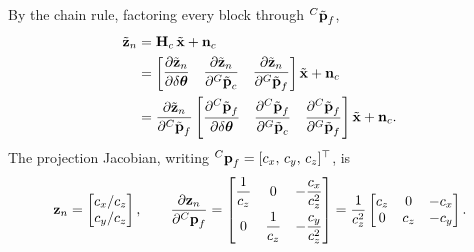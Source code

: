 By the chain rule, factoring every block through ${}^{C}\tilde{\boldsymbol{\mathbf{p}}}_f$,
\begin{align}
\tilde{\boldsymbol{\mathbf{z}}}_n &= \boldsymbol{\mathbf{H}}_c\,\tilde{\boldsymbol{\mathbf{x}}} + \boldsymbol{\mathbf{n}}_c \\
&= \begin{bmatrix} \dfrac{\partial\tilde{\boldsymbol{\mathbf{z}}}_n}{\partial\delta\boldsymbol{\mathbf{\theta}}} & \dfrac{\partial\tilde{\boldsymbol{\mathbf{z}}}_n}{\partial{}^{G}\tilde{\boldsymbol{\mathbf{p}}}_c} & \dfrac{\partial\tilde{\boldsymbol{\mathbf{z}}}_n}{\partial{}^{G}\tilde{\boldsymbol{\mathbf{p}}}_f} \end{bmatrix}\tilde{\boldsymbol{\mathbf{x}}} + \boldsymbol{\mathbf{n}}_c \\
&= \frac{\partial\tilde{\boldsymbol{\mathbf{z}}}_n}{\partial{}^{C}\tilde{\boldsymbol{\mathbf{p}}}_f}\begin{bmatrix} \dfrac{\partial{}^{C}\tilde{\boldsymbol{\mathbf{p}}}_f}{\partial\delta\boldsymbol{\mathbf{\theta}}} & \dfrac{\partial{}^{C}\tilde{\boldsymbol{\mathbf{p}}}_f}{\partial{}^{G}\tilde{\boldsymbol{\mathbf{p}}}_c} & \dfrac{\partial{}^{C}\tilde{\boldsymbol{\mathbf{p}}}_f}{\partial{}^{G}\tilde{\boldsymbol{\mathbf{p}}}_f} \end{bmatrix}\tilde{\boldsymbol{\mathbf{x}}} + \boldsymbol{\mathbf{n}}_c.
\end{align}
The projection Jacobian, writing ${}^{C}\boldsymbol{\mathbf{p}}_f = [c_x,\,c_y,\,c_z]^\top$, is
\begin{align}
\boldsymbol{\mathbf{z}}_n = \begin{bmatrix} c_x/c_z \\ c_y/c_z \end{bmatrix}, \qquad
\frac{\partial\boldsymbol{\mathbf{z}}_n}{\partial{}^{C}\boldsymbol{\mathbf{p}}_f} = \begin{bmatrix} \dfrac{1}{c_z} & 0 & -\dfrac{c_x}{c_z^{2}} \\[2ex] 0 & \dfrac{1}{c_z} & -\dfrac{c_y}{c_z^{2}} \end{bmatrix}
= \frac{1}{c_z^{2}}\begin{bmatrix} c_z & 0 & -c_x \\ 0 & c_z & -c_y \end{bmatrix}.
\end{align}

